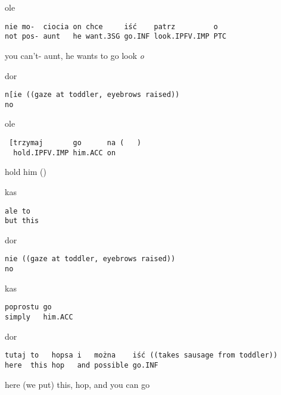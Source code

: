 \documentclass[output=paper]{langsci/langscibook}
\begin{document}
\vspace{-1mm}
%
\begin{mdframednoverticalspace}[style=firstfoc]
\begin{transbox}{1}{ole}
\begin{verbatim}
nie mo-  ciocia on chce     iść    patrz         o
not pos- aunt   he want.3SG go.INF look.IPFV.IMP PTC
\end{verbatim}
you can’t- aunt, he wants to go look \textit{o}
\end{transbox}
\end{mdframednoverticalspace}
%
\begin{mdframednoverticalspace}[style=secondfoc]
\begin{transbox}{2}{dor}
\begin{verbatim}
n[ie ((gaze at toddler, eyebrows raised))
no
\end{verbatim}
\end{transbox}
\end{mdframednoverticalspace}
%
\begin{mdframednoverticalspace}[style=firstfoc]
\begin{transbox}{3}{ole}
\begin{verbatim}
 [trzymaj       go      na (   )
  hold.IPFV.IMP him.ACC on
\end{verbatim}
\hspace{0.2cm} hold him (\hspace{0.6cm})
\end{transbox}
\end{mdframednoverticalspace}
%
\begin{transbox}{4}{kas}
\begin{verbatim}
ale to
but this
\end{verbatim}
\end{transbox}
%
\begin{mdframednoverticalspace}[style=secondfoc]
\begin{transbox}{5}{dor}
\begin{verbatim}
nie ((gaze at toddler, eyebrows raised))
no
\end{verbatim}
\end{transbox}
\end{mdframednoverticalspace}
%
\begin{transbox}{6}{kas}
\begin{verbatim}
poprostu go
simply   him.ACC
\end{verbatim}
\end{transbox}
%
\begin{mdframednoverticalspace}[style=secondfoc]
\begin{transbox}{7}{dor}
\begin{verbatim}
tutaj to   hopsa i   można    iść ((takes sausage from toddler))
here  this hop   and possible go.INF
\end{verbatim}
here (we put) this, hop, and you can go
\end{transbox}
\end{mdframednoverticalspace}\bigskip
\end{document}

